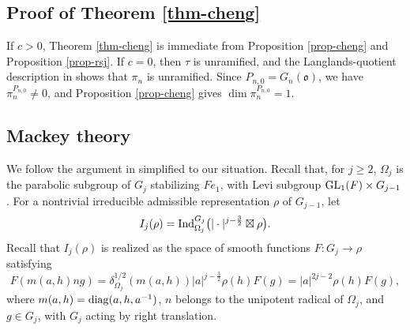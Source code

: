 \documentclass[12pt]{amsart}
\theoremstyle{definition}
\theoremstyle{remark}
\begin{document}
\subsection{Proof of Theorem \ref{thm-cheng}}\label{section-crsj}

If $c > 0$, Theorem \ref{thm-cheng} is immediate from Proposition \ref{prop-cheng} and Proposition \ref{prop-rsj}. If $c=0$, then $\tau$ is unramified, and the Langlands-quotient description in \cite[Proposition 3.2]{gt16} shows that $\pi_n$ is unramified. 
Since $P_{n,0}=G_n(\mathfrak o)$, we have $\pi_n^{P_{n,0}}\ne0$, and Proposition \ref{prop-cheng} gives $\dim\pi_n^{P_{n,0}}=1$.

\subsection{Mackey theory}\label{mackey}

We follow the argument in \cite[Proof of Theorem 15.1]{ggp12} simplified to our situation. Recall that, for $j\geq 2$, $\Omega_j$ is the parabolic subgroup of $G_j$ stabilizing $Fe_1$, with Levi subgroup ${\rm GL}_1(F)\times G_{j-1}$. For a nontrivial irreducible admissible representation $\rho$ of $G_{j-1}$, let
\[
I_j(\rho)
=
{\rm Ind}_{\Omega_j}^{G_j}
\bigl(|\cdot |^{j-\frac{3}{2}}\boxtimes \rho \bigr).
\]
Recall that $I_j(\rho)$ is realized as the space of smooth functions $F: G_j \to \rho$ satisfying
\begin{equation}\label{eq-induction}
F(m(a,h)ng)
=
\delta_{\Omega_j}^{1/2}(m(a,h))|a|^{j-\frac{3}{2}}
\rho(h)F(g)
=
|a|^{2j-2}\rho(h)F(g),
\end{equation}
where $m(a,h)={\rm diag}(a,h,a^{-1})$, $n$ belongs to the unipotent radical of $\Omega_j$, and $g\in G_j$,  with $G_j$ acting by right translation.
\end{document}
